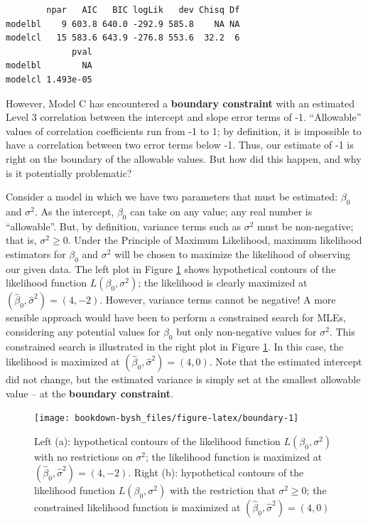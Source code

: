 \documentclass[
]{krantz}
\begin{document}
\begin{verbatim}
        npar   AIC   BIC logLik   dev Chisq Df
modelbl    9 603.8 640.0 -292.9 585.8    NA NA
modelcl   15 583.6 643.9 -276.8 553.6  32.2  6
             pval
modelbl        NA
modelcl 1.493e-05
\end{verbatim}

However, Model C has encountered a \textbf{boundary constraint}  with an estimated Level 3 correlation between the intercept and slope error terms of -1. ``Allowable'' values of correlation coefficients run from -1 to 1; by definition, it is impossible to have a correlation between two error terms below -1. Thus, our estimate of -1 is right on the boundary of the allowable values. But how did this happen, and why is it potentially problematic?

Consider a model in which we have two parameters that must be estimated: \(\beta_0\) and \(\sigma^2\). As the intercept, \(\beta_0\) can take on any value; any real number is ``allowable''. But, by definition, variance terms such as \(\sigma^2\) must be non-negative; that is, \(\sigma^2 \geq 0\). Under the Principle of Maximum Likelihood, maximum likelihood estimators for \(\beta_0\) and \(\sigma^2\) will be chosen to maximize the likelihood of observing our given data. The left plot in Figure \ref{fig:boundary} shows hypothetical contours of the likelihood function \(L(\beta_0, \sigma^2)\); the likelihood is clearly maximized at \((\hat{\beta}_0 , \hat{\sigma}^2)=(4,-2)\). However, variance terms cannot be negative! A more sensible approach would have been to perform a constrained search for MLEs, considering any potential values for \(\beta_0\) but only non-negative values for \(\sigma^2\). This constrained search is illustrated in the right plot in Figure \ref{fig:boundary}. In this case, the likelihood is maximized at \((\hat{\beta}_0 , \hat{\sigma}^2)=(4,0)\). Note that the estimated intercept did not change, but the estimated variance is simply set at the smallest allowable value -- at the \textbf{boundary constraint}.



\begin{figure}

{\centering \texttt{[image: bookdown-bysh\_files/figure-latex/boundary-1]} 

}

\caption{Left (a): hypothetical contours of the likelihood function \(L(\beta_0, \sigma^2)\) with no restrictions on \(\sigma^2\); the likelihood function is maximized at \((\hat{\beta}_0, \hat{\sigma}^2)=(4,-2)\). Right (b): hypothetical contours of the likelihood function \(L(\beta_0, \sigma^2)\) with the restriction that \(\sigma^2 \geq 0\); the constrained likelihood function is maximized at \((\hat{\beta}_0, \hat{\sigma}^2)=(4,0)\)}\label{fig:boundary}
\end{figure}
\end{document}
